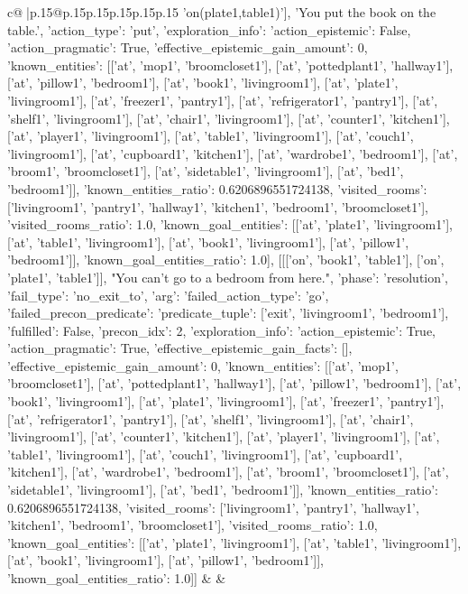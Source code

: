 \documentclass{article}
\begin{document}
{\begin{supertabular}{c@{$\;$}|p{.15\linewidth}@{}p{.15\linewidth}p{.15\linewidth}p{.15\linewidth}p{.15\linewidth}p{.15\linewidth}}
{{{'on(plate1,table1)'], 'You put the book on the table.', {'action_type': 'put', 'exploration_info': {'action_epistemic': False, 'action_pragmatic': True, 'effective_epistemic_gain_amount': 0, 'known_entities': [['at', 'mop1', 'broomcloset1'], ['at', 'pottedplant1', 'hallway1'], ['at', 'pillow1', 'bedroom1'], ['at', 'book1', 'livingroom1'], ['at', 'plate1', 'livingroom1'], ['at', 'freezer1', 'pantry1'], ['at', 'refrigerator1', 'pantry1'], ['at', 'shelf1', 'livingroom1'], ['at', 'chair1', 'livingroom1'], ['at', 'counter1', 'kitchen1'], ['at', 'player1', 'livingroom1'], ['at', 'table1', 'livingroom1'], ['at', 'couch1', 'livingroom1'], ['at', 'cupboard1', 'kitchen1'], ['at', 'wardrobe1', 'bedroom1'], ['at', 'broom1', 'broomcloset1'], ['at', 'sidetable1', 'livingroom1'], ['at', 'bed1', 'bedroom1']], 'known_entities_ratio': 0.6206896551724138, 'visited_rooms': ['livingroom1', 'pantry1', 'hallway1', 'kitchen1', 'bedroom1', 'broomcloset1'], 'visited_rooms_ratio': 1.0, 'known_goal_entities': [['at', 'plate1', 'livingroom1'], ['at', 'table1', 'livingroom1'], ['at', 'book1', 'livingroom1'], ['at', 'pillow1', 'bedroom1']], 'known_goal_entities_ratio': 1.0}}], [[['on', 'book1', 'table1'], ['on', 'plate1', 'table1']], "You can't go to a bedroom from here.", {'phase': 'resolution', 'fail_type': 'no_exit_to', 'arg': {'failed_action_type': 'go', 'failed_precon_predicate': {'predicate_tuple': ['exit', 'livingroom1', 'bedroom1'], 'fulfilled': False, 'precon_idx': 2}}, 'exploration_info': {'action_epistemic': True, 'action_pragmatic': True, 'effective_epistemic_gain_facts': [], 'effective_epistemic_gain_amount': 0, 'known_entities': [['at', 'mop1', 'broomcloset1'], ['at', 'pottedplant1', 'hallway1'], ['at', 'pillow1', 'bedroom1'], ['at', 'book1', 'livingroom1'], ['at', 'plate1', 'livingroom1'], ['at', 'freezer1', 'pantry1'], ['at', 'refrigerator1', 'pantry1'], ['at', 'shelf1', 'livingroom1'], ['at', 'chair1', 'livingroom1'], ['at', 'counter1', 'kitchen1'], ['at', 'player1', 'livingroom1'], ['at', 'table1', 'livingroom1'], ['at', 'couch1', 'livingroom1'], ['at', 'cupboard1', 'kitchen1'], ['at', 'wardrobe1', 'bedroom1'], ['at', 'broom1', 'broomcloset1'], ['at', 'sidetable1', 'livingroom1'], ['at', 'bed1', 'bedroom1']], 'known_entities_ratio': 0.6206896551724138, 'visited_rooms': ['livingroom1', 'pantry1', 'hallway1', 'kitchen1', 'bedroom1', 'broomcloset1'], 'visited_rooms_ratio': 1.0, 'known_goal_entities': [['at', 'plate1', 'livingroom1'], ['at', 'table1', 'livingroom1'], ['at', 'book1', 'livingroom1'], ['at', 'pillow1', 'bedroom1']], 'known_goal_entities_ratio': 1.0}}]] 
	  } 
	   } 
	   } 
	 & & \\ 
 


\end{supertabular}}
\end{document}
